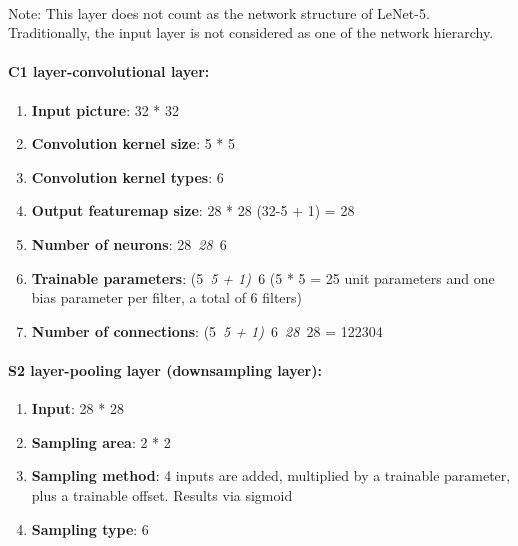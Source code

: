 \documentclass[10pt]{article} %
\begin{document}
\begin{spacing}{1.5}
\paragraph{}
\justifying
\noindent Note: This layer does not count as the network structure of LeNet-5. Traditionally, the input layer is not considered as one of the network hierarchy.
\noindent 
\paragraph{C1 layer-convolutional layer:}

\begin{enumerate}
\item \textbf{ Input picture}: 32 * 32

\item  \textbf{Convolution kernel size}: 5 * 5

\item  \textbf{Convolution kernel types}: 6

\item  \textbf{Output featuremap size}: 28 * 28 (32-5 + 1) = 28

\item  \textbf{Number of neurons}: 28~\textit{28~}6

\item  \textbf{Trainable parameters}: (5~\textit{5 + 1)~}6 (5 * 5 = 25 unit parameters and one bias parameter per filter, a total of 6 filters)

\item  \textbf{Number of connections}: (5~\textit{5 + 1)~}6~\textit{28~}28 = 122304
\end{enumerate}

\noindent 
\paragraph{S2 layer-pooling layer (downsampling layer):}

\begin{enumerate}
\item \textbf{ Input}: 28 * 28

\item  \textbf{Sampling area}: 2 * 2

\item  \textbf{Sampling method}: 4 inputs are added, multiplied by a trainable parameter, plus a trainable offset. Results via sigmoid

\item  \textbf{Sampling type}: 6


\end{enumerate}
\end{spacing}
\end{document}
